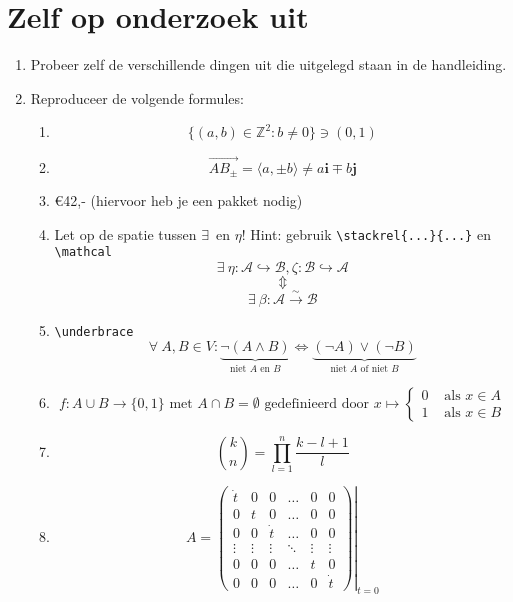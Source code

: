 \documentclass{article}
\begin{document}
\section{Zelf op onderzoek uit}
\begin{enumerate}
	\item Probeer zelf de verschillende dingen uit die uitgelegd staan in de handleiding.
	\item Reproduceer de volgende formules:
	\begin{enumerate}
		\item \[  \{(a,b) \in \mathbb{Z}^2 : b \neq 0\} \ni (0,1) \]
		\item \[\overrightarrow{AB_{\pm}} = \langle a, \pm b \rangle \neq a\mathbf{i} \mp b\mathbf{j}\]
		\item \euro 42,- (hiervoor heb je een pakket nodig)
		\item Let op de spatie tussen \textquotesingle\(\exists\)\textquotesingle \ en \textquotesingle\(\eta\)\textquotesingle! Hint: gebruik \verb|\stackrel{...}{...}| en \verb.\mathcal.
			\[\exists \ \eta :\mathcal{A} \hookrightarrow \mathcal{B}, \zeta : \mathcal{B} \hookrightarrow \mathcal{A}\]
			\[\Updownarrow\]
			\[\exists \ \beta : \mathcal{A} \stackrel{\sim}{\longrightarrow} \mathcal{B}\]
		\item \verb+\underbrace+
			\[\forall \ A, B \in V :  \underbrace{\neg(A \wedge B)}_{\text{niet } A \text{ en } B} \Longleftrightarrow \underbrace{(\neg A) \vee (\neg B)}_{\text{niet } A \text{ of niet } B}\]
		\item 			\[f : A \cup B \to \{0,1\} \text{ met } A \cap B = \emptyset \text{ gedefinieerd door } x \mapsto \begin{cases} 0 & \text{ als } x \in A\\1 & \text{ als } x \in B \end{cases}\]
		\item 
			\[\binom{k}{n} = \prod_{l = 1}^n\frac{k-l+1}{l}\]
		\item
			\[A = \left.\left(
			\begin{array}{cccccc}
				\dot{t} 	& 0 		& 0		& \ldots 	& 0 		& 0\\
				0 		& t 		& 0		& \ldots 	& 0 		& 0\\
				0 		& 0 		& \dot{t} & \ldots 	& 0 		& 0\\
				\vdots 	& \vdots 	& \vdots 	& \ddots 	& \vdots 	& \vdots \\
				0 		& 0 		& 0 		& \ldots 	& t 		& 0\\
				0 		& 0 		& 0 		& \ldots 	& 0 		& \dot{t}
			\end{array}\right)\right|_{t = 0}\]
	\end{enumerate}
\end{enumerate}
\end{document}
